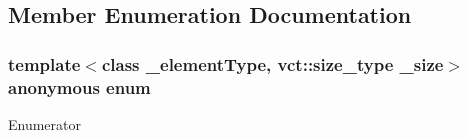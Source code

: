 \subsection{Member Enumeration Documentation}
\hypertarget{classvct_fixed_size_vector_ae684c096a8e0682238147d0cbc182cde}{\subsubsection[{anonymous enum}]{\setlength{\rightskip}{0pt plus 5cm}template$<$class \-\_\-element\-Type, vct\-::size\-\_\-type \-\_\-size$>$ anonymous enum}}\label{classvct_fixed_size_vector_ae684c096a8e0682238147d0cbc182cde}
\begin{Desc}
\item[Enumerator]\par
\begin{description}
\item[{\em 
\hypertarget{classvct_fixed_size_vector_ae684c096a8e0682238147d0cbc182cdeaa60fa332debc82a5c232c3330c14f4fd}{S\-I\-Z\-E\-M\-I\-N\-U\-S\-O\-N\-E}\label{classvct_fixed_size_vector_ae684c096a8e0682238147d0cbc182cdeaa60fa332debc82a5c232c3330c14f4fd}
}]\end{description}
\end{Desc}


